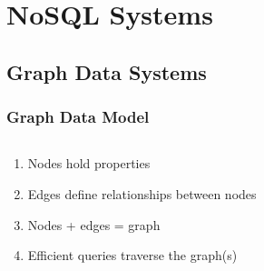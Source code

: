 \documentclass[11pt]{beamer}
\begin{document}
    \section{NoSQL Systems}\label{sec:noSQLDataModels}
    \subsection{Graph Data Systems}\label{subsec:graphDataModel}
    \begin{frame}
        \frametitle{Graph Data Model}
        \begin{columns}
            \begin{column}{0.5\textwidth}
                \begin{enumerate}
                    \item Nodes hold properties \bigskip
                    \item Edges define relationships between nodes \bigskip
                    \item Nodes + edges = graph \bigskip
                    \item Efficient queries traverse the graph(s)
                \end{enumerate}
            \end{column}
            \begin{column}{0.5\textwidth}
            \end{column}
        \end{columns}
    \end{frame}
\end{document}
